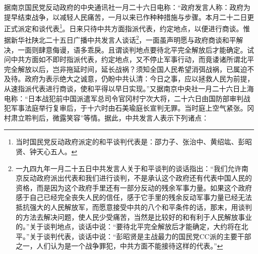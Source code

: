 \documentclass[cn,11pt,chinese]{elegantbook}
\begin{document}
据南京国民党反动政府的中央通讯社一月二十六日电称：“政府发言人称：政府为提早结束战争，以减轻人民痛苦，一月以来已作种种措施与步骤。本月二十二日更正式派定和谈代表\footnote[1]{ 当时国民党反动政府派定的和平谈判代表是：邵力子、张治中、黄绍竑、彭昭贤、钟天心五人。}。日来只待中共方面指派代表，约定地点，以便进行商谈。惟据新华社陕北二十五日广播中共发言人谈话\footnote[2]{ 一九四九年一月二十五日中共发言人关于和平谈判的谈话指出：“我们允许南京反动政府派出代表和我们进行谈判，不是承认这个政府还有代表中国人民的资格，而是因为这个政府手里还有一部分反动的残余军事力量。如果这个政府感于自己已经完全丧失人民的信任，感于它手里的残余反动军事力量已经无法抵抗强大的人民解放军，而愿意接受中共的八个和平条件的话，那末，用谈判的方法去解决问题，使人民少受痛苦，当然是比较好的和有利于人民解放事业的。”关于谈判地点，谈话中说：“要待北平完全解放后才能确定，大约将在北平。”关于谈判代表，谈话中说：“彭昭贤是主战最力的国民党CC派的主要干部之一，人们认为是一个战争罪犯，中共方面不能接待这样的代表。”}，一面虽声明愿与政府商谈和平解决，一面则肆意侮谩，语多乖戾。且谓谈判地点要待北平完全解放后才能确定。试问中共方面如不即时指派代表，约定地点，又不停止军事行动，而竟诿诸所谓北平完全解放以后，岂非拖延时间，延长战祸？须知全国人民希望消弭战祸，已属迫不及待。政府为表示绝大之诚意，仍盼中共认清：今日之事，应以拯救人民为前提，从速指派代表进行商谈，使和平得以早日实现。”又据南京中央社一月二十六日上海电称：“日本战犯前中国派遣军总司令官冈村宁次大将，二十六日由国防部审判战犯军事法庭举行复审后，于十六时由石美瑜庭长宣判无罪。当时庭上空气紧张。冈村肃立聆判后，微露笑容”等情。据此，中共发言人表示下列诸点：\\
\end{document}
